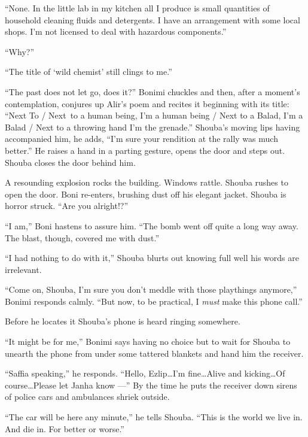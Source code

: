 \documentclass[twoside,11pt,openany]{book}
\begin{document}
``None. In the little lab in my kitchen all I produce is small quantities of household cleaning fluids and
detergents. I have an arrangement with some local shops. I'm not licensed to deal with hazardous
components.''

``Why?''

``The title of {}`wild chemist' still clings to me.''

``The past does not let go, does it?'' Bonimi chuckles and then, after a moment's
contemplation, conjures up Alir's poem and recites it beginning with its title: ``Next To / Next~to a
human being, I'm a human being / Next to a Balad, I'm a Balad / Next to a throwing hand I'm the grenade.''
Shouba's moving lips having accompanied him, he adds, ``I'm sure your rendition at the rally was much
better.'' He raises a hand in a parting gesture, opens the door and steps out. Shouba closes the door
behind him.

A resounding explosion rocks the building. Windows rattle. Shouba rushes to open the door. Boni re-enters, brushing dust
off his elegant jacket. Shouba is horror struck. ``Are you alright!?''

``I am,'' Boni hastens to assure him. {}``The bomb went off quite a long way away. The blast, though,
covered me with dust.''

``I had nothing to do with it,'' Shouba blurts out knowing full well his words are irrelevant.

``Come on, Shouba, I'm sure you don't meddle with those playthings anymore,'' Bonimi responds
calmly.  ``But now, to be practical, I \textit{must }make this phone call.''

 Before he locates it Shouba's phone is heard ringing somewhere.

``It might be for me,'' Bonimi says having no choice but to wait for Shouba to unearth the
phone from under some tattered{ }blankets and hand him the receiver.

``Saffia speaking,'' he responds. ``Hello, Ezlip{\ldots}I'm fine{\ldots}Alive and
kicking{\ldots}Of course{\ldots}Please let Janha know ---'' By the time he puts the receiver down sirens of
police cars and ambulances shriek outside.

``The car will be here any minute,'' he tells Shouba. ``This is the world we live
in. And die in. For better or worse.''


\bigskip

\chapter{}
\end{document}

